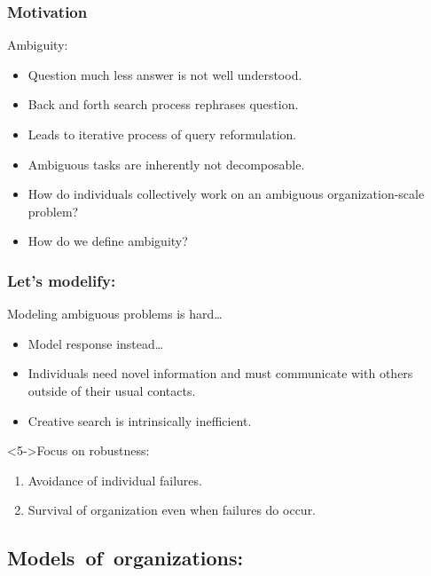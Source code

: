 \begin{frame}
  \frametitle{Motivation}

  \begin{block}{Ambiguity:}
    \begin{itemize}
    \item<1->
      Question much less answer is not well understood.
    \item<2->
      Back and forth search process rephrases question.
    \item<3->
      Leads to iterative process of query reformulation.
    \item<4->
      Ambiguous tasks are inherently not decomposable.
    \item<5->
      How do individuals collectively work
      on an ambiguous organization-scale problem?
    \item<6->
      How do we define ambiguity?
    \end{itemize}
\end{block}

\end{frame}

\begin{frame}
  \frametitle{Let's modelify:}

  \begin{block}{Modeling ambiguous problems is hard\ldots}
    \begin{itemize}
    \item<2->
      Model response instead\ldots
    \item<3-> 
      Individuals need novel information and must communicate with others
      outside of their usual contacts.
    \item<4->  
      Creative search is intrinsically inefficient.
    \end{itemize}
  \end{block}

  \begin{block}<5->{Focus on robustness:}
    \begin{enumerate}
    \item<6-> 
      Avoidance of individual failures.
    \item<7->
      Survival of organization even when failures do occur.
    \end{enumerate}
   \end{block}

\end{frame}

\subsection{Models\ of\ organizations:}

